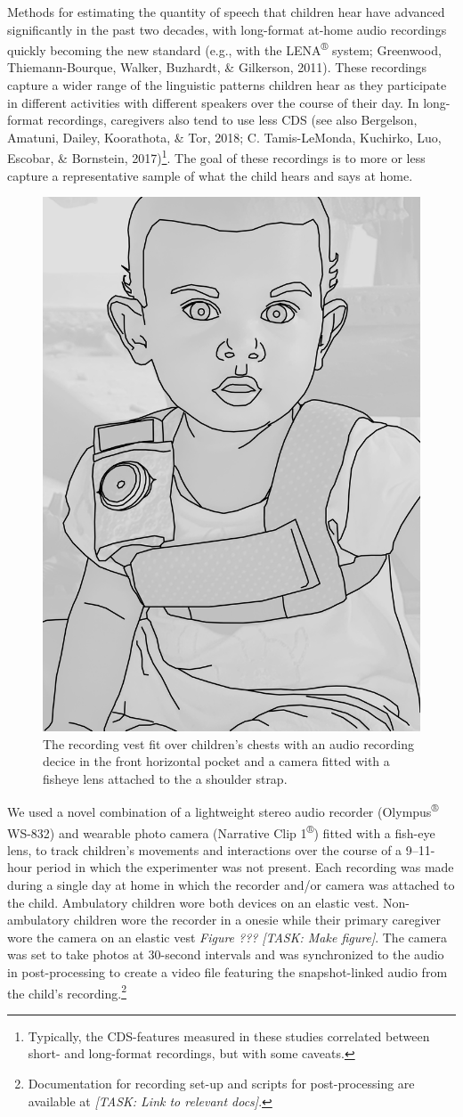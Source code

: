 \documentclass[floatsintext,man]{apa6}
\theoremstyle{definition}
\theoremstyle{definition}
\theoremstyle{definition}
\theoremstyle{remark}
\begin{document}
Methods for estimating the quantity of speech that children hear have
advanced significantly in the past two decades, with long-format at-home
audio recordings quickly becoming the new standard (e.g., with the
LENA\textsuperscript{®} system; Greenwood, Thiemann-Bourque, Walker,
Buzhardt, \& Gilkerson, 2011). These recordings capture a wider range of
the linguistic patterns children hear as they participate in different
activities with different speakers over the course of their day. In
long-format recordings, caregivers also tend to use less CDS (see also
Bergelson, Amatuni, Dailey, Koorathota, \& Tor, 2018; C. Tamis-LeMonda,
Kuchirko, Luo, Escobar, \& Bornstein, 2017)\footnote{Typically, the
  CDS-features measured in these studies correlated between short- and
  long-format recordings, but with some caveats.}. The goal of these
recordings is to more or less capture a representative sample of what
the child hears and says at home.

\begin{figure}
\includegraphics[width=0.5\linewidth]{Tseltal-CLE_files/TseltalCLE-RecordingVest} \caption{The recording vest fit over children's chests with an audio recording decice in the front horizontal pocket and a camera fitted with a fisheye lens attached to the a shoulder strap.}\label{fig:fig0}
\end{figure}

We used a novel combination of a lightweight stereo audio recorder
(Olympus\textsuperscript{®} WS-832) and wearable photo camera (Narrative
Clip 1\textsuperscript{®}) fitted with a fish-eye lens, to track
children's movements and interactions over the course of a 9--11-hour
period in which the experimenter was not present. Each recording was
made during a single day at home in which the recorder and/or camera was
attached to the child. Ambulatory children wore both devices on an
elastic vest. Non-ambulatory children wore the recorder in a onesie
while their primary caregiver wore the camera on an elastic vest
\emph{Figure ???} \emph{{[}TASK: Make figure{]}}. The camera was set to
take photos at 30-second intervals and was synchronized to the audio in
post-processing to create a video file featuring the snapshot-linked
audio from the child's recording.\footnote{Documentation for recording
  set-up and scripts for post-processing are available at \emph{{[}TASK:
  Link to relevant docs{]}}.}
\end{document}
